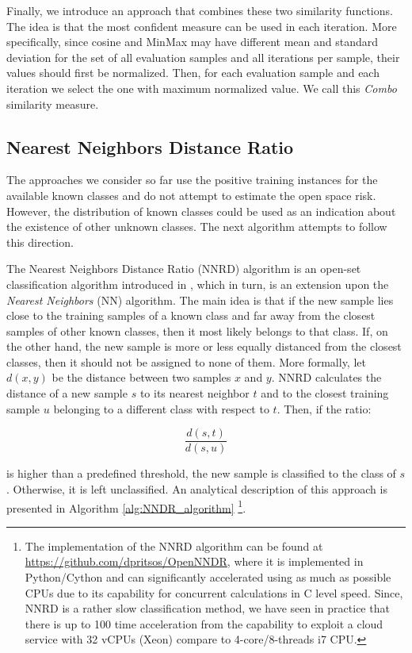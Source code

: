 Finally, we introduce an approach that combines these two similarity functions. The idea is that the most confident measure can be used in each iteration. More specifically, since cosine and MinMax may have different mean and standard deviation for the set of all evaluation samples and all iterations per sample, their values should first be normalized. Then, for each evaluation sample and each iteration we select the one with maximum normalized value. We call this \textit{Combo} similarity measure.

\subsection{Nearest Neighbors Distance Ratio}\label{chap:openset:sec:NNRD_Description}

The approaches we consider so far use the positive training instances for the available known classes and do not attempt to estimate the open space risk. However, the distribution of known classes could be used as an indication about the existence of other unknown classes. The next algorithm attempts to follow this direction.

The Nearest Neighbors Distance Ratio (NNRD) algorithm is an open-set classification algorithm introduced in , which in turn, is an extension upon the \textit{Nearest Neighbors} (NN) algorithm. The main idea is that if the new sample lies close to the training samples of a known class and far away from the closest samples of other known classes, then it most likely belongs to that class. If, on the other hand, the new sample is more or less equally distanced from the closest classes, then it should not be assigned to none of them. More formally, let $d(x,y)$ be the distance between two samples $x$ and $y$. NNRD calculates the distance of a new sample $s$ to its nearest neighbor $t$ and to the closest training sample $u$ belonging to a different class with respect to $t$. Then, if the ratio: 

\begin{equation}
    \frac{d(s,t)}{d(s,u)}
\end{equation}

\nointend is higher than a predefined threshold, the new sample is classified to the class of $s$. Otherwise, it is left unclassified. An analytical description of this approach is presented in Algorithm \ref{alg:NNDR_algorithm} \footnote{The implementation of the NNRD algorithm can be found at \url{https://github.com/dpritsos/OpenNNDR}, where it is implemented in Python/Cython and can significantly accelerated using as much as possible CPUs due to its capability for concurrent calculations in C level speed. Since, NNRD is a rather slow classification method, we have seen in practice that there is up to 100 time acceleration from the capability to exploit a cloud service with 32 vCPUs (Xeon) compare to 4-core/8-threads i7 CPU.}. 

